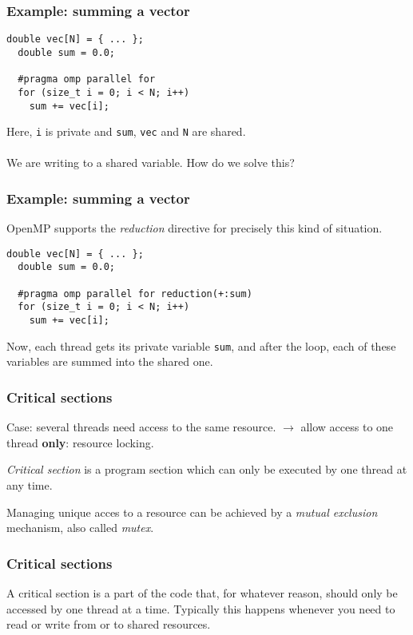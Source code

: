 \begin{frame}[fragile]
  \frametitle{Example: summing a vector}
\begin{lstlisting}[style=c]
  double vec[N] = { ... };
  double sum = 0.0;

  #pragma omp parallel for
  for (size_t i = 0; i < N; i++)
    sum += vec[i];
\end{lstlisting}
  Here, \texttt{i} is private and \texttt{sum}, \texttt{vec} and \texttt{N} are
  shared. \\~\\

  We are writing to a shared variable. How do we solve this?
\end{frame}

\begin{frame}[fragile]
  \frametitle{Example: summing a vector}
  OpenMP supports the \emph{reduction} directive for precisely this kind of
  situation.
\begin{lstlisting}[style=c]
  double vec[N] = { ... };
  double sum = 0.0;

  #pragma omp parallel for reduction(+:sum)
  for (size_t i = 0; i < N; i++)
    sum += vec[i];
\end{lstlisting}
  Now, each thread gets its private variable \texttt{sum}, and after the loop,
  each of these variables are summed into the shared one.
\end{frame}

\begin{frame}
\frametitle{Critical sections}

Case: several threads need access to the same resource.
$\rightarrow$ allow access to one thread \textbf{only}: resource locking.

\medskip
\textit{Critical section} is a program section which can only be executed by one thread at any time.

\medskip
Managing unique acces to a resource can be achieved by a \textit{mutual exclusion} mechanism, also called \textit{mutex}.

\end{frame}

\begin{frame}[fragile]
  \frametitle{Critical sections}
  \begin{center}
    \scalebox{0.8}{}
  \end{center}
  A critical section is a part of the code that, for whatever reason, should
  only be accessed by one thread at a time. Typically this happens whenever you
  need to read or write from or to shared resources.
\end{frame}

